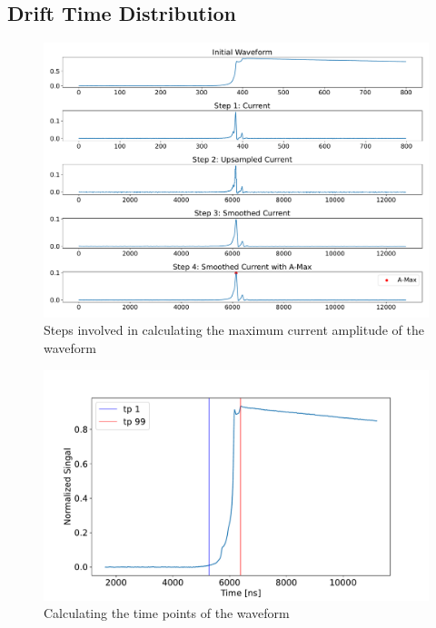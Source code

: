 \subsection{Drift Time Distribution}
\begin{figure}[htb!]
    \centering
    \includegraphics[width=0.99\linewidth, trim={0pc 1pc 0pc 0pc},clip]{ch8/figs/curr_amp_calc.pdf}
    \caption{Steps involved in calculating the maximum current amplitude of the waveform}
    \label{fig:ch8:curr_amp_calc}
\end{figure}

\begin{figure}[htb!]
    \centering
    \includegraphics[width=0.99\linewidth]{ch8/figs/time_calc.pdf}
    \caption{Calculating the time points of the waveform}
    \label{fig:ch8:time_calc}
\end{figure}


